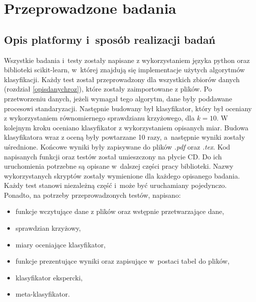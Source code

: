 \chapter{Przeprowadzone badania}

\section{Opis platformy i~sposób realizacji badań}
Wszystkie badania i~testy zostały napisane z wykorzystaniem języka python oraz biblioteki scikit-learn, w~której znajdują się implementacje użytych algorytmów klasyfikacji. Każdy test został przeprowadzony dla wszystkich zbiorów danych (rozdział \ref{opisdanychroz}), które zostały zaimportowane z plików. Po przetworzeniu danych, jeżeli wymagał tego algorytm, dane były poddawane procesowi standaryzacji. Następnie budowany był klasyfikator, który był oceniany z wykorzystaniem równomiernego sprawdzianu krzyżowego, dla $k=10$. W kolejnym kroku oceniano klasyfikator z wykorzystaniem opisanych miar. Budowa klasyfikatora wraz z oceną były powtarzane 10 razy, a~następnie wyniki zostały uśrednione. Końcowe wyniki były zapisywane do plików \textit{.pdf} oraz \textit{.tex}. Kod napisanych funkcji oraz testów został umieszczony na płycie CD. Do ich uruchomienia potrzebne są opisane w~dalszej części pracy biblioteki. Nazwy wykorzystanych skryptów zostały wymienione dla każdego opisanego badania. Każdy test stanowi niezależną część i~może być uruchamiany pojedynczo. Ponadto, na potrzeby przeprowadzonych testów, napisano:
\begin{itemize}
	\item funkcje wczytujące dane z plików oraz wstępnie przetwarzające dane,
	\item sprawdzian krzyżowy,
	\item miary oceniające klasyfikator,
	\item funkcje prezentujące wyniki oraz zapisujące w~postaci tabel do plików,
	\item klasyfikator ekspercki,
	\item meta-klasyfikator.
\end{itemize}

